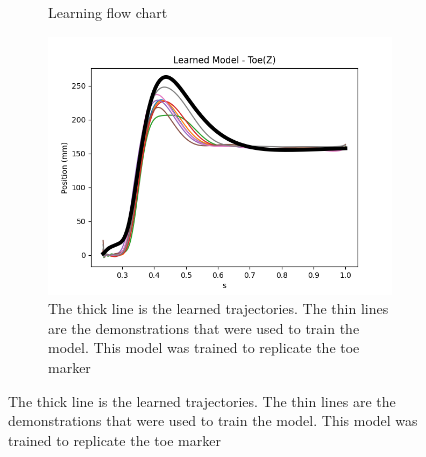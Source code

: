 \begin{figure}[h!]
\begin{subfigure}{0.4\linewidth}
        \caption{Learning flow chart}
        \label{fig:flowchart}
    \end{subfigure}
    \begin{subfigure}{0.4\linewidth} 
        \centering
        \captionsetup{justification=centering}
        \centerline{
        \includegraphics[scale=0.50]{images/software/learnedZ.png}}
        \caption{The thick line is the learned trajectories. The thin lines are the demonstrations that were used to train the model. This model was trained to replicate the toe marker}
        \label{fig:learned}
    \end{subfigure}
    \label{fig:LFDexample}
\end{figure}


